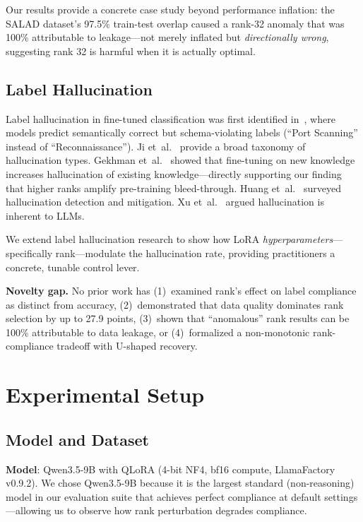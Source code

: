 \documentclass[journal]{IEEEtran}
\begin{document}
Our results provide a concrete case study beyond performance inflation: the SALAD dataset's 97.5\% train-test overlap caused a rank-32 anomaly that was 100\% attributable to leakage---not merely inflated but \emph{directionally wrong}, suggesting rank 32 is harmful when it is actually optimal.

\subsection{Label Hallucination}
Label hallucination in fine-tuned classification was first identified in~\cite{p3}, where models predict semantically correct but schema-violating labels (``Port Scanning'' instead of ``Reconnaissance''). Ji et~al.~\cite{ji2023} provide a broad taxonomy of hallucination types. Gekhman et~al.~\cite{gekhman2024} showed that fine-tuning on new knowledge increases hallucination of existing knowledge---directly supporting our finding that higher ranks amplify pre-training bleed-through. Huang et~al.~\cite{huang2023} surveyed hallucination detection and mitigation. Xu et~al.~\cite{xu2024} argued hallucination is inherent to LLMs.

We extend label hallucination research to show how LoRA \emph{hyperparameters}---specifically rank---modulate the hallucination rate, providing practitioners a concrete, tunable control lever.

\textbf{Novelty gap.} No prior work has (1)~examined rank's effect on label compliance as distinct from accuracy, (2)~demonstrated that data quality dominates rank selection by up to 27.9 points, (3)~shown that ``anomalous'' rank results can be 100\% attributable to data leakage, or (4)~formalized a non-monotonic rank-compliance tradeoff with U-shaped recovery.

\section{Experimental Setup}

\subsection{Model and Dataset}
\textbf{Model}: Qwen3.5-9B with QLoRA (4-bit NF4, bf16 compute, LlamaFactory v0.9.2). We chose Qwen3.5-9B because it is the largest standard (non-reasoning) model in our evaluation suite that achieves perfect compliance at default settings---allowing us to observe how rank perturbation degrades compliance.
\end{document}
